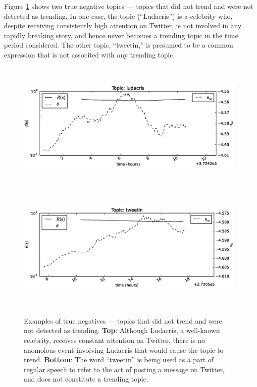 Figure \ref{fig:examples2} shows two true negative topics --- topics that did
not trend and were not detected as trending. In one case, the topic
(``Ludacris'') is a celebrity who, despite receiving consistently high attention
on Twitter, is not involved in any rapidly breaking story, and hence never
becomes a trending topic in the time period considered. The other topic,
``tweetin,'' is presumed to be a common expression that is not associted with
any trending topic.
\begin{figure}[!h]
\begin{center}
\includegraphics[height=2.5in]{../fig/final/detection_examples/tn/ludacris.eps}
\includegraphics[height=2.5in]{../fig/final/detection_examples/tn/tweetin.eps}
\end{center}
\caption{\label{fig:examples2} Examples of true negatives --- topics that did
  not trend and were not detected as trending. {\bf Top}: Although Ludacris, a
  well-known celebrity, receives constant attention on Twitter, there is no
  anomolous event involving Ludacris that would cause the topic to trend. {\bf
    Bottom}: The word ``tweetin'' is being used as a part of regular speech to
  refer to the act of posting a message on Twitter, and does not constitute a
  trending topic. }
\end{figure}

